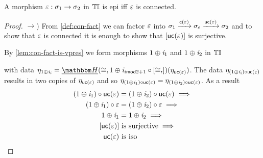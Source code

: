 \begin{lemma}\label{lem:epis-tinstC}
   A morphism $\varepsilon : \sigma_1 \to \sigma_2$ in ${\mathbb{T}\mathbb{I}}$ is epi iff $\varepsilon$ is connected.
\end{lemma}
\begin{proof}\nl
    $\to$)  
    From \cref{def:con-fact} we can factor $\varepsilon$ into $\sigma_1 \xrightarrow{\mathsf{c}(\varepsilon)} \sigma_\varepsilon \xrightarrow{\mathsf{uc}(\varepsilon)} \sigma_2$ and
    to show that $\varepsilon$ is connected it is enough to show that $[\mathsf{uc}(\varepsilon)]$ is surjective.

    By \cref{lem:con-fact-is-vpres} we form morphisms $1 \oplus \mathit{i}_1$ and $1 \oplus \mathit{i}_2$ in ${\mathbb{T}\mathbb{I}}$
    \begin{center}
    \end{center}
    with data $\mvarM_{1 \mplus \incl_\vi} = \dheapF(\iso, 1 \oplus \incl_{\vi \mod 2 + 1} \comp \anyL{\iso_{\mathsf{r}}})(\mvarM_{\uncon\me})$.
    The data $\eta_{(1 \oplus \mathit{i}_{\mathit{i}}) \circ \mathsf{uc}(\varepsilon)}$ results in two copies of $\eta_{\mathsf{uc}(\varepsilon)}$ and so
    $\eta_{(1 \oplus \mathit{i}_1) \circ \mathsf{uc}(\varepsilon)} = \eta_{(1 \oplus \mathit{i}_2) \circ \mathsf{uc}(\varepsilon)}$. 
    As a result 
    \begin{align*}
        (1 \oplus \incl_1) \comp \uncon\me & = (1 \oplus \incl_2) \comp \uncon\me \implies \\
        (1 \oplus \incl_1) \comp \me        & = (1 \oplus \incl_2) \comp \me \implies \\
        1 \oplus \incl_1                    & = 1 \oplus \incl_2 \implies \\
        \anyL{\uncon\me}                   &\text{ is surjective} \implies \\
        \uncon\me                          &\text{ is iso} \\
    \end{align*}


\end{proof}
